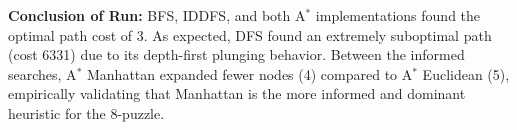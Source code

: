 \documentclass[11pt, a4paper]{article}
\begin{document}
\noindent \textbf{Conclusion of Run:} BFS, IDDFS, and both A$^*$ implementations found the optimal path cost of 3. As expected, DFS found an extremely suboptimal path (cost 6331) due to its depth-first plunging behavior. Between the informed searches, A$^*$ Manhattan expanded fewer nodes (4) compared to A$^*$ Euclidean (5), empirically validating that Manhattan is the more informed and dominant heuristic for the 8-puzzle.
\end{document}
